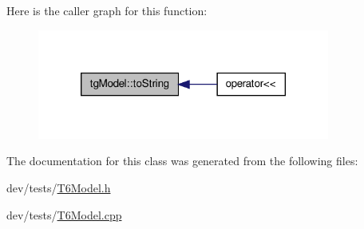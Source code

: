 Here is the caller graph for this function\-:\nopagebreak
\begin{figure}[H]
\begin{center}
\leavevmode
\includegraphics[width=272pt]{classtg_model_af37b0c1a6d4060bfe0bb9b5038a17725_icgraph}
\end{center}
\end{figure}




The documentation for this class was generated from the following files\-:\begin{DoxyCompactItemize}
\item 
dev/tests/\hyperlink{_t6_model_8h}{T6\-Model.\-h}\item 
dev/tests/\hyperlink{_t6_model_8cpp}{T6\-Model.\-cpp}\end{DoxyCompactItemize}
